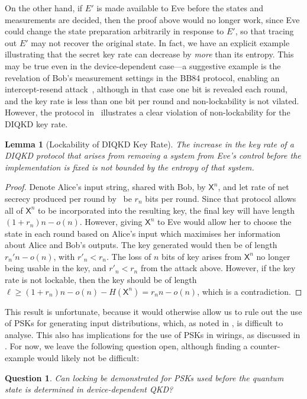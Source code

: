 \documentclass[10pt, a4paper]{article}
\numberwithin{equation}{section} %
\newcounter{stmt} %
\theoremstyle{definition}
\theoremstyle{plain}
\newtheorem{question}{Question}
\newtheorem{lemma}[stmt]{Lemma}
\newcommand{\?}{\mathrel{?}} %
\newcommand{\crv}[1]{\mathsf{#1}}
\begin{document}
            On the other hand, if \(E'\) is made available to Eve before the states and measurements are decided, then the proof above would no longer work, since Eve could change the state preparation arbitrarily in response to \(E'\), so that tracing out \(E'\) may not recover the original state. In fact, we have an explicit example illustrating that the secret key rate can decrease by \emph{more} than its entropy. This may be true even in the device-dependent case---a suggestive example is the revelation of Bob's measurement settings in the BB84 protocol, enabling an intercept-resend attack~\cite{PracticalQKD}, although in that case one bit is revealed each round, and the key rate is less than one bit per round and non-lockability is not vilated. However, the protocol in~\cite[Prot. 2]{DIQKD_FiniteSize} illustrates a clear violation of non-lockability for the DIQKD key rate.
            \begin{lemma}[Lockability of DIQKD Key Rate]\label{thm:dilock}
              The increase in the key rate of a DIQKD protocol that arises from removing a system from Eve's control \emph{before} the implementation is fixed is not bounded by the entropy of that system.
            \end{lemma}
            \begin{proof}
              Denote Alice's input string, shared with Bob, by \(\crv{X}^n\), and let rate of net secrecy produced per round by~\cite[Prot. 2]{DIQKD_FiniteSize} be \(r_n\) bits per round. Since that protocol allows all of \(\crv{X}^n\) to be incorporated into the resulting key, the final key will have length \((1+r_n)n - o(n)\). However, giving \(\crv{X}^n\) to Eve would allow her to choose the state in each round based on Alice's input which maximises her information about Alice and Bob's outputs. The key generated would then be of length \(r_n'n - o(n)\), with \(r'_n < r_n\). The loss of \(n\) bits of key arises from \(\crv{X}^n\) no longer being usable in the key, and \(r'_n < r_n\) from the attack above. However, if the key rate is not lockable, then the key should be of length \(\ell \geq (1+r_n)n - o(n) - H(\crv{X}^n) = r_nn - o(n)\), which is a contradiction.
            \end{proof}

            This result is unfortunate, because it would otherwise allow us to rule out the use of PSKs for generating input distributions, which, as noted in , is difficult to analyse. This also has implications for the use of PSKs in wirings, as discussed in . For now, we leave the following question open, although finding a counter-example would likely not be difficult:
            \begin{question}
              Can locking be demonstrated for PSKs used before the quantum state is determined in device-dependent QKD\@?
            \end{question}
\end{document}
